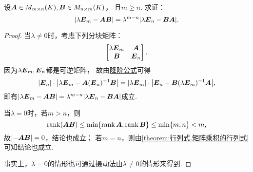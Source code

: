 \begin{example}\label{example:单位矩阵与两矩阵乘积之差.单位矩阵与两矩阵乘积之差的行列式}
设\(\boldsymbol{A} \in M_{m \times n}(K),
\boldsymbol{B} \in M_{n \times m}(K)\)，
且\(m \geq n\).
求证：\begin{equation}
	\abs{\lambda\boldsymbol{E}_m-\boldsymbol{A}\boldsymbol{B}} = \lambda^{m-n} \abs{\lambda\boldsymbol{E}_n-\boldsymbol{B}\boldsymbol{A}}.
\end{equation}
\begin{proof}
当\(\lambda\neq0\)时，考虑下列分块矩阵：\[
	\begin{bmatrix}
		\lambda\boldsymbol{E}_m & \boldsymbol{A} \\
		\boldsymbol{B} & \boldsymbol{E}_n
	\end{bmatrix}.
\]
因为\(\lambda\boldsymbol{E}_m,\boldsymbol{E}_n\)都是可逆矩阵，
故由\hyperref[theorem:逆矩阵.行列式降阶定理]{降阶公式}可得\[
	\abs{\boldsymbol{E}_n} \cdot \abs{\lambda\boldsymbol{E}_m - \boldsymbol{A} (\boldsymbol{E}_n)^{-1} \boldsymbol{B}}
	= \abs{\lambda\boldsymbol{E}_m} \cdot \abs{\boldsymbol{E}_n - \boldsymbol{B} (\lambda\boldsymbol{E}_m)^{-1} \boldsymbol{A}},
\]
即有\(\abs{\lambda\boldsymbol{E}_m-\boldsymbol{A}\boldsymbol{B}} = \lambda^{m-n} \abs{\lambda\boldsymbol{E}_n-\boldsymbol{B}\boldsymbol{A}}\)成立.

当\(\lambda=0\)时，若\(m>n\)，则\[
	\rank(\boldsymbol{A}\boldsymbol{B}) \leq \min\{\rank\boldsymbol{A},\rank\boldsymbol{B}\} \leq \min\{m,n\} < m,
\]
故\(\abs{-\boldsymbol{A}\boldsymbol{B}}=0\)，结论也成立；
若\(m = n\)，则由\cref{theorem:行列式.矩阵乘积的行列式} 可知结论也成立.

事实上，\(\lambda=0\)的情形也可通过摄动法由\(\lambda\neq0\)的情形来得到.
\end{proof}
\end{example}

